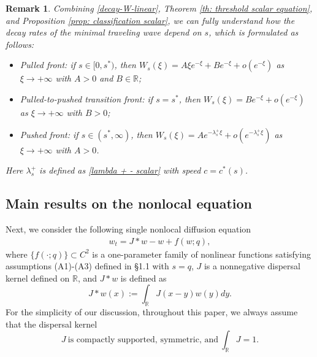 \documentclass[11pt,a4paper]{article}
\newtheorem{remark}[theorem]{\textbf{Remark}}
\numberwithin{equation}{section}
\numberwithin{figure}{section}
\newcommand\beaa{\begin{eqnarray*}}
\newcommand\eeaa{\end{eqnarray*}}
\begin{document}
\begin{remark}
Combining \eqref{decay-W-linear}, Theorem \ref{th: threshold scalar equation}, and Proposition \ref{prop: classification scalar},
we can fully understand how the decay rates of the minimal traveling wave depend on $s$, which is formulated as follows:
\begin{itemize}
    \item[(1)] Pulled front: if $s\in[0,s^*)$, then $W_s(\xi)=A\xi e^{-\xi}+Be^{-\xi}+o(e^{-\xi})$ as $\xi\to+\infty$ with $A>0$ and $B\in \mathbb{R}$;
    \item[(2)] Pulled-to-pushed transition front: if $s=s^*$, then $W_s(\xi)=Be^{-\xi}+o(e^{-\xi})$ as $\xi\to+\infty$ with $B>0$;
    \item[(3)] Pushed front: if $s\in(s^*,\infty)$, then $W_s(\xi)=Ae^{-\lambda_s^+\xi}+o(e^{-\lambda_s^+\xi})$ as $\xi\to+\infty$ with $A>0$.%
\end{itemize}
Here $\lambda_{s}^+$ is defined as \eqref{lambda + - scalar} with speed $c=c^*(s)$.

\end{remark}





\subsection{Main results on the nonlocal equation}\label{sec: intro nonlocal}

\noindent

Next, we  consider the following single nonlocal diffusion equation
\beaa%
w_t= J\ast w-w +f(w;q),
\eeaa
where
$\{f(\cdot;q)\}\subset C^2$ is a one-parameter family of nonlinear functions satisfying assumptions (A1)-(A3) defined in \S 1.1 with $s=q$, %
$J$ is a nonnegative dispersal kernel defined on $\mathbb{R}$, and $J\ast w$ is defined as
$$J\ast w(x):=\int_{\mathbb{R}}J(x-y)w(y)dy.$$ %
For the simplicity of our discussion, throughout this paper, we always assume that the dispersal kernel
\begin{equation}\label{assumption on J}
J\ \text{is compactly supported, symmetric, and}\ \int_{\mathbb{R}}J=1.
\end{equation}



\end{document}
